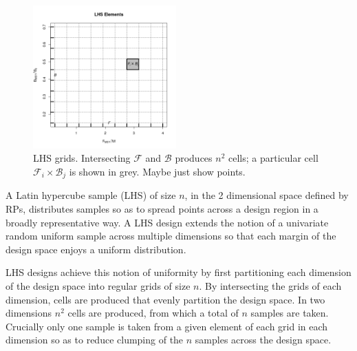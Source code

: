 \documentclass[12pt]{article}
\begin{document}
%
\begin{figure}
\vspace{-2.9cm}
\includegraphics[width=0.49\textwidth]{../gpBias/designGrid.png}
\caption{ LHS grids. Intersecting $\mathcal{F}$ and $\mathcal{B}$ produces $n^2$
cells; a particular cell $\mathcal{F}_i\times\mathcal{B}_j$ is shown in grey. 
{\color{red} Maybe just show points.}
}
\end{figure}


%
A Latin hypercube sample (LHS) of size $n$, in the 2 dimensional space defined 
by RPs, distributes samples so as to spread points across a design region in a 
broadly representative way. A LHS design extends the notion of a univariate 
random uniform sample across multiple dimensions so that each margin of the design 
space enjoys a uniform distribution. 

%
LHS designs achieve this notion of uniformity by first partitioning each dimension 
of the design space into regular grids of size $n$. By intersecting the grids 
of each dimension, cells are produced that evenly partition the design space. 
In two dimensions $n^2$ cells are produced, from which a total of $n$ samples 
are taken. Crucially only one sample is taken from a given element of each grid 
in each dimension so as to reduce clumping of the $n$ samples across the design space.
\end{document}
